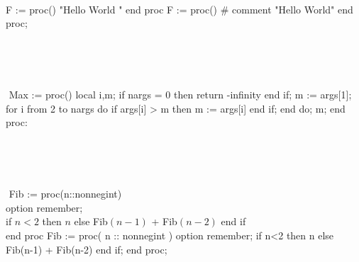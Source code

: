 ‎\documentclass{article}‎
\begin{document}
‎




‎\begin{code}{ F‎ :‎= proc()‎ "‎Hello World‎ " ‎end proc}‎
‎F‎ :‎= proc() # comment‎
     "‎Hello World‎"
‎end proc;‎
‎\end{code}‎


‎\begin{code}{}‎
‎Max‎ :‎= proc()‎
‎local i,m;‎ 
‎if nargs = 0 then‎
‎return‎ -‎infinity‎
‎end if;‎
‎m‎ :‎= args[1];‎
‎for i from 2 to nargs do‎
‎if args[i] > m then‎
‎m‎ :‎= args[i]‎
‎end if;‎
‎end do;‎
‎m;‎
‎end proc‎:
‎\end{code}‎




‎\begin{code}{‎
‎Fib‎ :‎= proc(n::nonnegint)\\‎
‎option remember;\\‎
‎ if ‎‎$‎n < 2‎$‎ then ‎‎$‎n‎$‎ else Fib‎$‎(n‎ - ‎1)‎$‎‎ + ‎Fib‎$‎(n‎ - ‎2)‎$‎ end if\\‎
‎end proc}‎
‎Fib‎ :‎= proc( n‎ :: ‎nonnegint‎ )
     ‎option remember;‎
     ‎if ‎‎n<2‎‎ then‎
          ‎‎‎n‎‎‎
     ‎else‎
          ‎Fib‎‎(n-1)‎‎‎ + ‎Fib‎‎(n-2)‎‎‎
     ‎end if;‎
‎end proc;‎
‎\end{code}‎


‎
\end{document}
